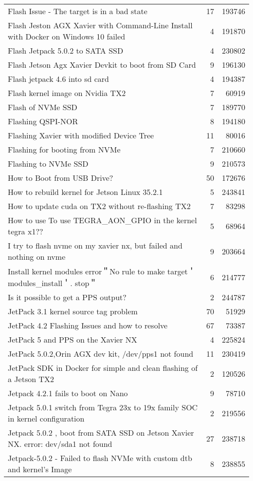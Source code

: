 \begin{longtable}{p{}rr}
Flash Issue - The target is in a bad state&17&193746\\
Flash Jeston AGX Xavier with Command-Line Install with Docker on Windows 10 failed&4&191870\\
Flash Jetpack 5.0.2 to SATA SSD&4&230802\\
Flash Jetson Agx Xavier Devkit to boot from SD Card&9&196130\\
Flash jetpack 4.6 into sd card&4&194387\\
Flash kernel image on Nvidia TX2&7&60919\\
Flash of NVMe SSD&7&189770\\
Flashing QSPI-NOR&8&194180\\
Flashing Xavier with modified Device Tree&11&80016\\
Flashing for booting from NVMe&7&210660\\
Flashing to NVMe SSD&9&210573\\
How to Boot from USB Drive?&50&172676\\
How to rebuild kernel for Jetson Linux 35.2.1&5&243841\\
How to update cuda on TX2 without re-flashing TX2&7&83298\\
How to use To use TEGRA\_AON\_GPIO in the kernel tegra x1??&5&68964\\
I try to flash nvme on my xavier nx, but failed and nothing on nvme&9&203664\\
Install kernel modules error＂No rule to make target＇modules\_install＇. stop＂&6&214777\\
Is it possible to get a PPS output?&2&244787\\
JetPack 3.1 kernel source tag problem&70&51929\\
JetPack 4.2 Flashing Issues and how to resolve&67&73387\\
JetPack 5 and PPS on the Xavier NX&4&225824\\
JetPack 5.0.2,Orin AGX dev kit, /dev/pps1 not found&11&230419\\
JetPack SDK in Docker for simple and clean flashing of a Jetson TX2&2&120526\\
Jetpack 4.2.1 fails to boot on Nano&9&78710\\
Jetpack 5.0.1 switch from Tegra 23x to 19x family SOC in kernel configuration&2&219556\\
Jetpack 5.0.2 , boot from SATA SSD on Jetson Xavier NX. error: dev/sda1 not found&27&238718\\
Jetpack-5.0.2 - Failed to flash NVMe with custom dtb and kernel’s Image&8&238855\\

\end{longtable}
